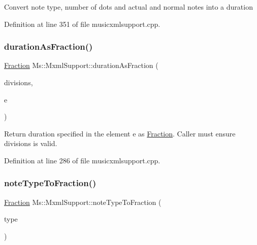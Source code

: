 Convert note type, number of dots and actual and normal notes into a duration 

Definition at line 351 of file musicxmlsupport.\+cpp.

\mbox{\label{class_ms_1_1_mxml_support_ac718646c8a30332db7b71603e846917b}} 
\subsubsection{\texorpdfstring{duration\+As\+Fraction()}{durationAsFraction()}}
{\footnotesize\ttfamily \hyperlink{class_ms_1_1_fraction}{Fraction} Ms\+::\+Mxml\+Support\+::duration\+As\+Fraction (\begin{DoxyParamCaption}\item[{const int}]{divisions,  }\item[{const Q\+Dom\+Element}]{e }\end{DoxyParamCaption})\hspace{0.3cm}{\ttfamily [static]}}

Return duration specified in the element e as \hyperlink{class_ms_1_1_fraction}{Fraction}. Caller must ensure divisions is valid. 

Definition at line 286 of file musicxmlsupport.\+cpp.

\mbox{\label{class_ms_1_1_mxml_support_ab9182c04357874bc351f1e8c30c1a942}} 
\subsubsection{\texorpdfstring{note\+Type\+To\+Fraction()}{noteTypeToFraction()}}
{\footnotesize\ttfamily \hyperlink{class_ms_1_1_fraction}{Fraction} Ms\+::\+Mxml\+Support\+::note\+Type\+To\+Fraction (\begin{DoxyParamCaption}\item[{Q\+String}]{type }\end{DoxyParamCaption})\hspace{0.3cm}{\ttfamily [static]}}


